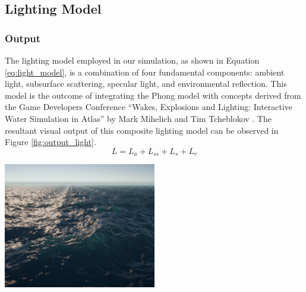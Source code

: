 \subsection{Lighting Model}

\subsubsection{Output}

The lighting model employed in our simulation, as shown in Equation \ref{eq:light_model}, is a combination of four fundamental components: ambient light, subsurface scattering, specular light, and environmental reflection. This model is the outcome of integrating the Phong model with concepts derived from the Game Developers Conference “Wakes, Explosions and Lighting: Interactive Water Simulation in Atlas” by Mark Mihelich and Tim Tcheblokov \cite{mark2021}. The resultant visual output of this composite lighting model can be observed in Figure \ref{fig:output_light}.
\begin{equation}
    L = L_a + L_{ss} + L_s + L_r
    \label{eq:light_model}
\end{equation}
\begin{minipage}{1\textwidth}
    \centering
    \includegraphics[width=0.50\textwidth]{"images/output_light.png"}
    \label{fig:output_light}
\end{minipage}

